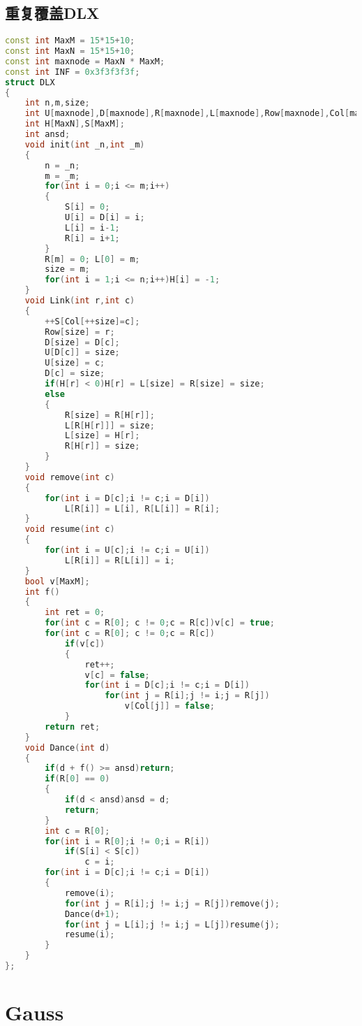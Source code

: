 \subsection{重复覆盖DLX}
\begin{lstlisting}[language=C++]
const int MaxM = 15*15+10;
const int MaxN = 15*15+10;
const int maxnode = MaxN * MaxM;
const int INF = 0x3f3f3f3f;
struct DLX
{
    int n,m,size;
    int U[maxnode],D[maxnode],R[maxnode],L[maxnode],Row[maxnode],Col[maxnode];
    int H[MaxN],S[MaxM];
    int ansd;
    void init(int _n,int _m)
    {
        n = _n;
        m = _m;
        for(int i = 0;i <= m;i++)
        {
            S[i] = 0;
            U[i] = D[i] = i;
            L[i] = i-1;
            R[i] = i+1;
        }
        R[m] = 0; L[0] = m;
        size = m;
        for(int i = 1;i <= n;i++)H[i] = -1;
    }
    void Link(int r,int c)
    {
        ++S[Col[++size]=c];
        Row[size] = r;
        D[size] = D[c];
        U[D[c]] = size;
        U[size] = c;
        D[c] = size;
        if(H[r] < 0)H[r] = L[size] = R[size] = size;
        else
        {
            R[size] = R[H[r]];
            L[R[H[r]]] = size;
            L[size] = H[r];
            R[H[r]] = size;
        }
    }
    void remove(int c)
    {
        for(int i = D[c];i != c;i = D[i])
            L[R[i]] = L[i], R[L[i]] = R[i];
    }
    void resume(int c)
    {
        for(int i = U[c];i != c;i = U[i])
            L[R[i]] = R[L[i]] = i;
    }
    bool v[MaxM];
    int f()
    {
        int ret = 0;
        for(int c = R[0]; c != 0;c = R[c])v[c] = true;
        for(int c = R[0]; c != 0;c = R[c])
            if(v[c])
            {
                ret++;
                v[c] = false;
                for(int i = D[c];i != c;i = D[i])
                    for(int j = R[i];j != i;j = R[j])
                        v[Col[j]] = false;
            }
        return ret;
    }
    void Dance(int d)
    {
        if(d + f() >= ansd)return;
        if(R[0] == 0)
        {
            if(d < ansd)ansd = d;
            return;
        }
        int c = R[0];
        for(int i = R[0];i != 0;i = R[i])
            if(S[i] < S[c])
                c = i;
        for(int i = D[c];i != c;i = D[i])
        {
            remove(i);
            for(int j = R[i];j != i;j = R[j])remove(j);
            Dance(d+1);
            for(int j = L[i];j != i;j = L[j])resume(j);
            resume(i);
        }
    }
};
\end{lstlisting}

\section{Gauss}
